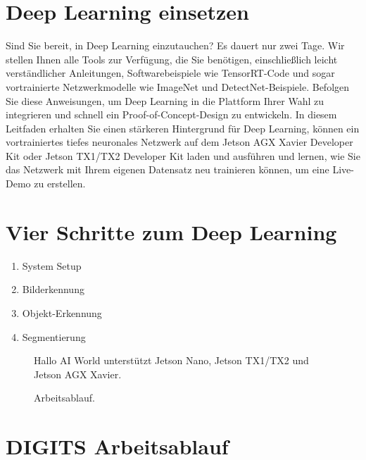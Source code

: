 {\section{Deep Learning einsetzen}

Sind Sie bereit, in Deep Learning einzutauchen? Es dauert nur zwei Tage. Wir stellen Ihnen alle Tools zur Verfügung, die Sie benötigen, einschließlich leicht verständlicher Anleitungen, Softwarebeispiele wie TensorRT-Code und sogar vortrainierte Netzwerkmodelle wie ImageNet und DetectNet-Beispiele. Befolgen Sie diese Anweisungen, um Deep Learning in die Plattform Ihrer Wahl zu integrieren und schnell ein Proof-of-Concept-Design zu entwickeln. In diesem Leitfaden erhalten Sie einen stärkeren Hintergrund für Deep Learning, können ein vortrainiertes tiefes neuronales Netzwerk auf dem Jetson AGX Xavier Developer Kit oder Jetson TX1/TX2 Developer Kit laden und ausführen und lernen, wie Sie das Netzwerk mit Ihrem eigenen Datensatz neu trainieren können, um eine Live-Demo zu erstellen.


\section{Vier Schritte zum Deep Learning}


\begin{enumerate}
	
  \item System Setup
  \item Bilderkennung
  \item Objekt-Erkennung
  \item Segmentierung
\end{enumerate}

\begin{figure}
	
	\caption{Hallo AI World unterstützt Jetson Nano, Jetson TX1/TX2 und Jetson AGX Xavier.}
	
\end{figure}

\begin{figure}
	
	\caption{Arbeitsablauf.}
	
\end{figure}


\section{DIGITS Arbeitsablauf}



}
